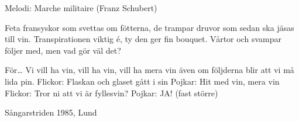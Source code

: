 \begin{song}

\begin{songmeta}
Melodi: Marche militaire (Franz Schubert)
\end{songmeta}

\begin{songtext}
Feta fransyskor som svettas om fötterna,
de trampar druvor som sedan ska jäsas till vin.
Transpirationen viktig é,
ty den ger fin bouquet.
Vårtor och svampar följer med,
men vad gör väl det?

För\ldots
Vi vill ha vin, vill ha vin, vill ha mera vin
även om följderna blir att vi må lida pin.
Flickor: Flaskan och glaset gått i sin
Pojkar:  Hit med vin, mera vin
Flickor: Tror ni att vi är fyllesvin?
Pojkar:  JA! (fast större)
\end{songtext}

\begin{songnotes}
Sångarstriden 1985, Lund
\end{songnotes}
\end{song}
